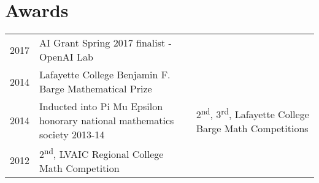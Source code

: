 \documentclass{deedy-resume-openfont}
\begin{document}
\begin{minipage}[t]{0.66\textwidth}

\section{Awards}
\begin{tabular}{rll}
2017	     & AI Grant Spring 2017 finalist - OpenAI Lab\\
2014	     & Lafayette College Benjamin F. Barge Mathematical Prize\\
2014       & Inducted into Pi Mu Epsilon honorary national mathematics society
2013-14	     & 2\textsuperscript{nd}, 3\textsuperscript{rd}, Lafayette College Barge Math Competitions\\
2012	     & 2\textsuperscript{nd}, LVAIC Regional College Math Competition\\
\end{tabular}
\sectionsep


\renewcommand\refname{\vskip -1.5cm} %


\nocite{*}

\end{minipage}
\end{document}
